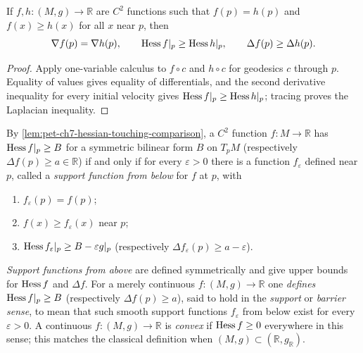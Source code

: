 \begin{lemma}
  \label{lem:pet-ch7-hessian-touching-comparison}
  If $f,h:(M,g)\to\mathbb{R}$ are $C^2$ functions such that $f(p)=h(p)$ and
  $f(x)\ge h(x)$ for all $x$ near $p$, then
  \[
    \nabla f(p)=\nabla h(p),\qquad \operatorname{Hess} f|_p\ge \operatorname{Hess} h|_p,\qquad \Delta f(p)\ge \Delta h(p).
  \]
\end{lemma}
\begin{proof}
  \sketch
  Apply one-variable calculus to \(f\circ c\) and \(h\circ c\) for geodesics \(c\) through \(p\). Equality of values gives equality of differentials, and the second derivative inequality for every initial velocity gives \(\operatorname{Hess} f|_p\ge\operatorname{Hess} h|_p\); tracing proves the Laplacian inequality.
\end{proof}

\begin{definition}
  \label{def:pet-ch7-support-function}
  By \cref{lem:pet-ch7-hessian-touching-comparison}, a $C^2$ function
  $f:M\to\mathbb{R}$ has $\operatorname{Hess} f|_p\ge B$ for a symmetric bilinear form $B$ on $T_pM$
  (respectively $\Delta f(p)\ge a\in\mathbb{R}$) if and only if for every
  $\varepsilon>0$ there is a function $f_\varepsilon$ defined near $p$, called a
  \emph{support function from below} for $f$ at $p$, with
  \begin{enumerate}
    \item[(1)] $f_\varepsilon(p)=f(p)$;
    \item[(2)] $f(x)\ge f_\varepsilon(x)$ near $p$;
    \item[(3)] $\operatorname{Hess} f_\varepsilon|_p\ge B-\varepsilon g|_p$ (respectively
      $\Delta f_\varepsilon(p)\ge a-\varepsilon$).
  \end{enumerate}
  \emph{Support functions from above} are defined symmetrically and give upper
  bounds for $\operatorname{Hess} f$ and $\Delta f$. For a merely continuous $f:(M,g)\to\mathbb{R}$
  one \emph{defines} $\operatorname{Hess} f|_p\ge B$ (respectively $\Delta f(p)\ge a$), said to
  hold in the \emph{support} or \emph{barrier sense}, to mean that such smooth
  support functions $f_\varepsilon$ from below exist for every $\varepsilon>0$.
  A continuous $f:(M,g)\to\mathbb{R}$ is \emph{convex} if $\operatorname{Hess} f\ge0$ everywhere in
  this sense; this matches the classical definition when $(M,g)\subset(\mathbb{R},g_\mathbb{R})$.
\end{definition}

